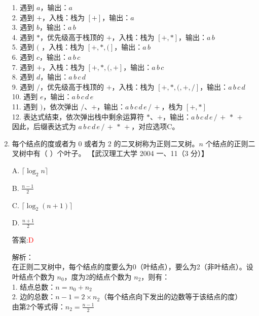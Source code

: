 \documentclass[lang=cn,newtx,10pt,scheme=chinese]{../../../elegantbook}
\begin{document}
\begin{enumerate}
    1. 遇到 $a$，输出：$a$\\
    2. 遇到 $+$，入栈：栈为 $[+]$，输出：$a$\\
    3. 遇到 $b$，输出：$a \, b$\\
    4. 遇到 $\ast$，优先级高于栈顶的 $+$，入栈：栈为 $[+, \ast]$，输出：$a \, b$\\
    5. 遇到 $($ ，入栈：栈为 $[+, \ast, (]$，输出：$a \, b$\\
    6. 遇到 $c$，输出：$a \, b \, c$\\
    7. 遇到 $+$，入栈：栈为 $[+, \ast, (, +]$，输出：$a \, b \, c$\\
    8. 遇到 $d$，输出：$a \, b \, c \, d$\\
    9. 遇到 $/$，优先级高于栈顶的 $+$，入栈：栈为 $[+, \ast, (, +, /]$，输出：$a \, b \, c \, d$\\
    10. 遇到 $e$，输出：$a \, b \, c \, d \, e$\\
    11. 遇到 $)$，依次弹出 $/$、$+$，输出：$a \, b \, c \, d \, e \, / \, +$，栈为 $[+, \ast]$\\
    12. 表达式结束，依次弹出栈中剩余运算符 $\ast$、$+$，输出：$a \, b \, c \, d \, e \, / \, + \, \ast \, +$\\
    
    因此，后缀表达式为 $a \, b \, c \, d \, e \, / \, + \, \ast \, +$，对应选项C。\\  
    \item 每个结点的度或者为 0 或者为 2 的二叉树称为正则二叉树。$n$ 个结点的正则二叉树中有（ ）个叶子。  
    【武汉理工大学 2004 一、11（3 分）】

     A. $\lceil \log_2 n \rceil$  

    B. $\frac{n - 1}{2}$  

    C. $\lceil \log_2 (n + 1) \rceil$  

    D. $\frac{n + 1}{2}$  
    
    答案:\textcolor{red}{D}
    
    解析：\\
    在正则二叉树中，每个结点的度要么为0（叶结点），要么为2（非叶结点）。设叶结点个数为 $n_0$，度为2的结点个数为 $n_2$，则有：\\
    
    1. 结点总数：$n = n_0 + n_2$\\
    2. 边的总数：$n - 1 = 2 \times n_2$（每个结点向下发出的边数等于该结点的度）\\
    
    由第2个等式得：$n_2 = \frac{n - 1}{2}$\\
    

\end{enumerate}
\end{document}
